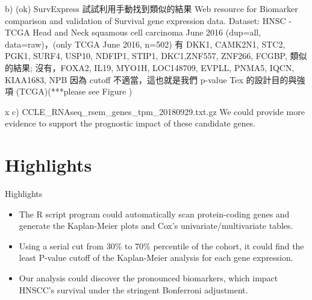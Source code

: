 \documentclass[preprint,12pt]{elsarticle}
\begin{document}
b) (ok) SurvExpress
試試利用手動找到類似的結果 Web resource for Biomarker comparison and validation of Survival gene expression data. 
Dataset: HNSC - TCGA Head and Neck squamous cell carcinoma June 2016 (dup=all, data=raw)，(only TCGA June 2016, n=502) \cite{Aguirre-Gamboa2013}
有  DKK1, CAMK2N1, STC2, PGK1, SURF4, USP10, NDFIP1, STIP1, DKC1,ZNF557, ZNF266, FCGBP,  類似的結果;
沒有，FOXA2, IL19, MYO1H, LOC148709, EVPLL, PNMA5, IQCN, KIAA1683, NPB
因為 cutoff 不適當，這也就是我們 p-value Tex 的設計目的與強項
 (TCGA)(***please see Figure \label{fig_SurvExpress})

x c) CCLE_RNAseq_rsem_genes_tpm_20180929.txt.gz
We could provide more evidence to support the prognostic impact of these candidate genes.



\section{Highlights}
Highlights
\begin{itemize}
    \item The R script program could automatically scan protein-coding genes and generate the Kaplan-Meier plots and Cox's univariate/multivariate tables.
    \item Using a serial cut from 30\% to 70\% percentile of the cohort, it could find the least P-value cutoff of the Kaplan-Meier analysis for each gene expression.
    \item Our analysis could discover the pronounced biomarkers, which impact HNSCC's survival under the stringent Bonferroni adjustment.
\end{itemize}



%

\end{document}
